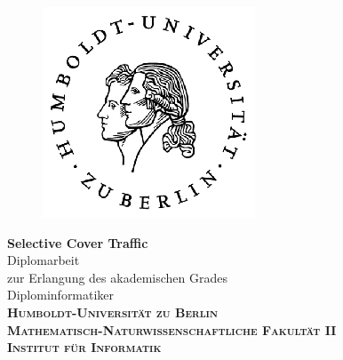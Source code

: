 \documentclass[a4paper,10pt]{article}
\begin{document}
\thispagestyle{empty}

\hspace{20cm}
\vspace{-2cm}

\begin{figure}[H] \hspace{11cm}
\includegraphics[width=3.2 cm]{HU_Logo}
\end{figure}

\begin{center}
  \vspace{0.5 cm}
  \huge{\bf Selective Cover Traffic} \\ %
  \vspace{1.5cm}
  \LARGE  Diplomarbeit \\ %
  \vspace{1cm}
  \Large zur Erlangung des akademischen Grades \\
  Diplominformatiker \\ %
  \vspace{2cm}
  {\large
    \bf{
      \scshape
      Humboldt-Universit\"at zu Berlin \\
      Mathematisch-Naturwissenschaftliche Fakult\"at II \\
      Institut f\"ur Informatik\\
    }
  } 
\end{center}
\vspace {5 cm}%
\end{document}
